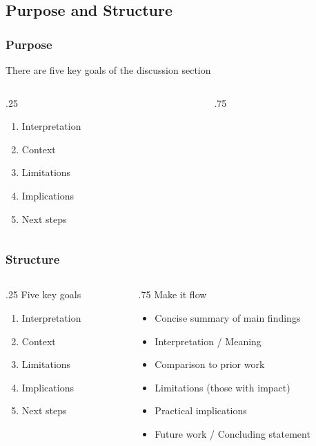 \documentclass[aspectratio=169]{beamer} %
\begin{document}
	\subsection{Purpose and Structure}
	\begin{frame}
		\frametitle{Purpose}
		There are five key goals of the discussion section
		\begin{columns}
			\begin{column}{.25\linewidth}
			\begin{enumerate}
				\item Interpretation
				\item Context
				\item Limitations
				\item Implications
				\item Next steps
			\end{enumerate}
			\end{column}
			\begin{column}{.75\linewidth}
				~
			\end{column}
		\end{columns}
	\end{frame}

	\begin{frame}
		\frametitle{Structure}
		\begin{columns}
			\begin{column}{.25\linewidth}
				Five key goals
				\begin{enumerate}
					\item Interpretation
					\item Context
					\item Limitations
					\item Implications
					\item Next steps
				\end{enumerate}
			\end{column}
			\begin{column}{.75\linewidth}
				Make it flow
				\begin{itemize}%
					\item Concise summary of main findings%
					\item Interpretation / Meaning%
					\item Comparison to prior work%
					\item Limitations (those with impact)%
					\item Practical implications%
					\item Future work / Concluding statement
				\end{itemize}
			\end{column}
		\end{columns}
	\end{frame}
\end{document}
